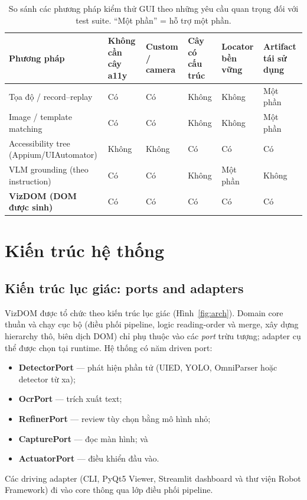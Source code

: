 \documentclass[11pt,a4paper]{article}
\begin{document}
\begin{table}[H]
  \centering\footnotesize
  \caption{So sánh các phương pháp kiểm thử GUI theo những yêu cầu quan trọng đối
  với test suite. ``Một phần'' = hỗ trợ một phần.}
  \label{tab:methods}
  \begin{tabular}{@{}p{3.0cm}p{1.7cm}p{1.6cm}p{1.6cm}p{1.6cm}p{1.5cm}@{}}
    \toprule
    Phương pháp & Không cần cây a11y & Custom / camera & Cây có cấu trúc & Locator bền vững & Artifact tái sử dụng \\
    \midrule
    Tọa độ / record--replay & Có & Có & Không & Không & Một phần \\
    Image / template matching & Có & Có & Không & Không & Một phần \\
    Accessibility tree (Appium/UIAutomator) & Không & Không & Có & Có & Có \\
    VLM grounding (theo instruction) & Có & Có & Không & Một phần & Không \\
    \textbf{VizDOM (DOM được sinh)} & Có & Có & Có & Có & Có \\
    \bottomrule
  \end{tabular}
\end{table}

\section{Kiến trúc hệ thống}
\label{sec:arch}

\subsection{Kiến trúc lục giác: ports and adapters}
VizDOM được tổ chức theo kiến trúc lục giác (Hình~\ref{fig:arch}). Domain core thuần
và chạy cục bộ (điều phối pipeline, logic reading-order và merge, xây dựng hierarchy
thô, biên dịch DOM) chỉ phụ thuộc vào các \emph{port} trừu tượng; adapter cụ thể
được chọn tại runtime. Hệ thống có năm driven port:
\begin{itemize}[leftmargin=1.4em]
  \item \textbf{DetectorPort} --- phát hiện phần tử (UIED, YOLO, OmniParser hoặc
        detector từ xa);
  \item \textbf{OcrPort} --- trích xuất text;
  \item \textbf{RefinerPort} --- review tùy chọn bằng mô hình nhỏ;
  \item \textbf{CapturePort} --- đọc màn hình; và
  \item \textbf{ActuatorPort} --- điều khiển đầu vào.
\end{itemize}
Các driving adapter (CLI, PyQt5 Viewer, Streamlit dashboard và thư viện Robot
Framework) đi vào core thông qua lớp điều phối pipeline.
\end{document}
